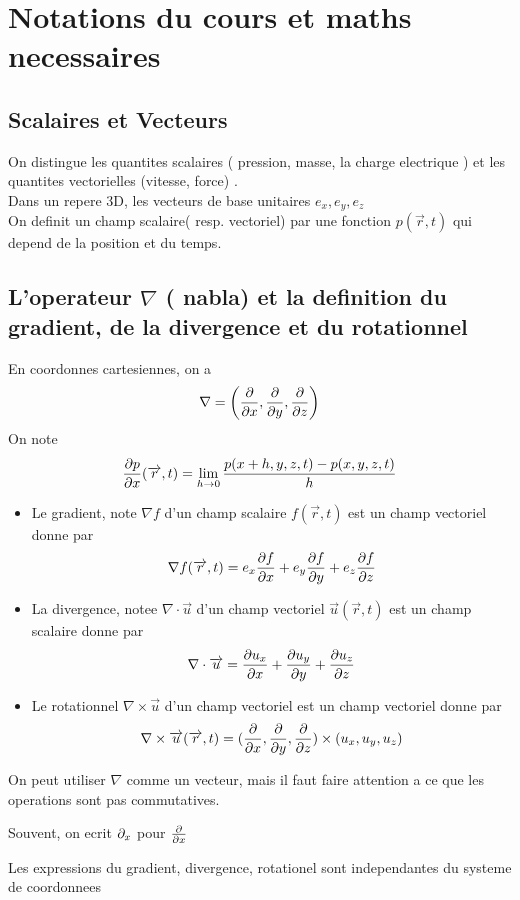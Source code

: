 \documentclass[../main.tex]{subfiles}
\begin{document}
\section{Notations du cours et maths necessaires}
\subsection{Scalaires et Vecteurs}
On distingue les quantites scalaires  ( pression, masse, la charge electrique ) et les quantites vectorielles (vitesse, force) .\\
Dans un repere 3D, les vecteurs de base unitaires $e_x, e_y, e_z$\\
On definit un champ scalaire( resp. vectoriel)  par une fonction $p( \vec{r},t) $ qui depend de la position et du temps.
\subsection{L'operateur $\nabla$ ( nabla) et la definition du gradient, de la divergence et du rotationnel}
En coordonnes cartesiennes, on a
\[ 
	\nabla = \left( \frac{\partial}{\partial x},\frac{\partial}{\partial y}, \frac{\partial}{\partial z}\right) 
\]
On note
\[ 
	\frac{\partial p}{\partial x}( \overrightarrow{r},t) = \lim_{h \to 0} \frac{p( x+h,y,z,t) - p( x,y,z,t) }{h}
\]
\begin{itemize}
	\item Le gradient, note $\nabla f$ d'un champ scalaire $f( \vec{r},t) $ est un champ vectoriel donne par
		\[ 
			\nabla f( \overrightarrow{r},t) = e_x \frac{\partial f}{\partial x} + e_y \frac{\partial f}{\partial y} + e_z \frac{\partial f}{\partial z}
		\]
	
	\item La divergence, notee $\nabla \cdot \vec{u}$ d'un champ vectoriel $\vec{u}( \vec{r},t) $ est un champ scalaire donne par
		\[ 
		\nabla \cdot  \overrightarrow{u} = \frac{\partial u_x}{\partial x} + \frac{\partial u_y}{\partial y} + \frac{\partial u_z}{\partial z}
		\]

	\item Le rotationnel $\nabla \times \vec{u}$ d'un champ vectoriel est un champ vectoriel donne par
		\[ 
			\nabla \times \overrightarrow{u}( \overrightarrow{r},t) =( \frac{\partial}{\partial x}, \frac{\partial}{\partial y}, \frac{\partial}{\partial z}) \times ( u_x,u_y,u_z) 
		\]
		
\end{itemize}
\begin{rmq}
On peut utiliser $\nabla$ comme un vecteur, mais il faut faire attention a ce que les operations sont pas commutatives.
\end{rmq}
\begin{rmq}
Souvent, on ecrit $\partial_x$ pour $\frac{\partial}{\partial x}$
\end{rmq}
\begin{rmq}
Les expressions du gradient, divergence, rotationel sont independantes du systeme de coordonnees
\end{rmq}
\end{document}
